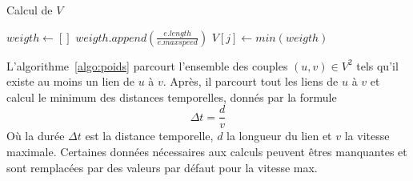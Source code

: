 \begin{algorithm}
\caption{Calcul de $V$}\label{algo:poids}
\begin{algorithmic}
			\State $weigth \gets []$
				\State $weigth.append\left(\frac{e.length}{e.maxspeed}\right)$
			\EndFor
			\State $V[j]\gets min(weigth)$
		\EndFor
	\EndFor
\end{algorithmic}
\end{algorithm}

L'algorithme~\ref{algo:poids} parcourt l'ensemble des couples $(u,v)\in V^2$ tels qu'il existe au moins un lien de $u$ à $v$. %
	Après, il parcourt tout les liens de $u$ à $v$ et calcul le minimum des distances temporelles, donnés par la formule
	\[\Delta t=\frac{d}{v}\]
	Où la durée $\Delta t$ est la distance temporelle, $d$ la longueur du lien et $v$ la vitesse maximale.
Certaines données nécessaires aux calculs peuvent êtres manquantes et sont remplacées par des valeurs par défaut pour la vitesse max. %